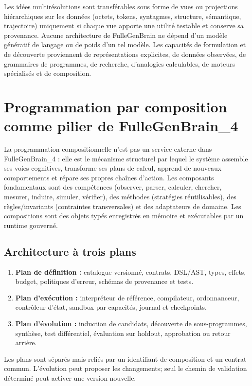 \documentclass[11pt,a4paper]{article}
\theoremstyle{definition}
\theoremstyle{plain}
\theoremstyle{remark}
\begin{document}
Les idées multirésolutions sont transférables sous forme de vues ou projections hiérarchiques sur les données (octets, tokens, syntagmes, structure, sémantique, trajectoire) uniquement si chaque vue apporte une utilité testable et conserve sa provenance. Aucune architecture de FulleGenBrain ne dépend d'un modèle génératif de langage ou de poids d'un tel modèle. Les capacités de formulation et de découverte proviennent de représentations explicites, de données observées, de grammaires de programmes, de recherche, d'analogies calculables, de moteurs spécialisés et de composition.

\section{Programmation par composition comme pilier de FulleGenBrain\_4}
La programmation compositionnelle n'est pas un service externe dans FulleGenBrain\_4 : elle est le mécanisme structurel par lequel le système assemble ses voies cognitives, transforme ses plans de calcul, apprend de nouveaux comportements et répare ses propres chaînes d'action. Les composants fondamentaux sont des compétences (observer, parser, calculer, chercher, mesurer, induire, simuler, vérifier), des méthodes (stratégies réutilisables), des règles/invariants (contraintes transversales) et des adaptateurs de domaine. Les compositions sont des objets typés enregistrés en mémoire et exécutables par un runtime gouverné.

\subsection{Architecture à trois plans}
\begin{enumerate}
\item \textbf{Plan de définition :} catalogue versionné, contrats, DSL/AST, types, effets, budget, politiques d'erreur, schémas de provenance et tests.
\item \textbf{Plan d'exécution :} interpréteur de référence, compilateur, ordonnanceur, contrôleur d'état, sandbox par capacités, journal et checkpoints.
\item \textbf{Plan d'évolution :} induction de candidats, découverte de sous-programmes, synthèse, test différentiel, évaluation sur holdout, approbation ou retour arrière.
\end{enumerate}
Les plans sont séparés mais reliés par un identifiant de composition et un contrat commun. L'évolution peut proposer les changements; seul le chemin de validation déterminé peut activer une version nouvelle.
\end{document}
